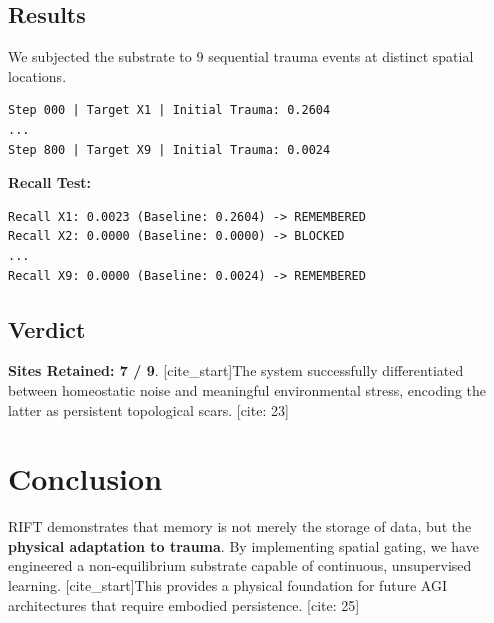 \documentclass[11pt, a4paper]{article}
\begin{document}
\subsection{Results}
We subjected the substrate to 9 sequential trauma events at distinct spatial locations.
\begin{lstlisting}
Step 000 | Target X1 | Initial Trauma: 0.2604
...
Step 800 | Target X9 | Initial Trauma: 0.0024
\end{lstlisting}

\textbf{Recall Test:}
\begin{lstlisting}
Recall X1: 0.0023 (Baseline: 0.2604) -> REMEMBERED
Recall X2: 0.0000 (Baseline: 0.0000) -> BLOCKED
...
Recall X9: 0.0000 (Baseline: 0.0024) -> REMEMBERED
\end{lstlisting}

\subsection{Verdict}
\textbf{Sites Retained: 7 / 9}. [cite_start]The system successfully differentiated between homeostatic noise and meaningful environmental stress, encoding the latter as persistent topological scars. [cite: 23]

\section{Conclusion}
RIFT demonstrates that memory is not merely the storage of data, but the \textbf{physical adaptation to trauma}. By implementing spatial gating, we have engineered a non-equilibrium substrate capable of continuous, unsupervised learning. [cite_start]This provides a physical foundation for future AGI architectures that require embodied persistence. [cite: 25]
\end{document}
